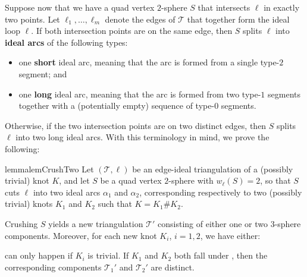 \documentclass[a4paper,UKenglish,cleveref, autoref, thm-restate]{lipics-v2021}
\newcommand{\tri}{\mathcal{T}}
\begin{document}
Suppose now that we have a quad vertex $2$-sphere $S$ that intersects $\ell$ in exactly two points.
Let $\ell_1, \ldots, \ell_m$ denote the edges of $\tri$ that together form the ideal loop $\ell$.
If both intersection points are on the same edge, then $S$ splits $\ell$ into \textbf{ideal arcs} of the following types:
\begin{itemize}
\item
one \textbf{short} ideal arc, meaning that the arc is formed from a single type-$2$ segment; and
\item
one \textbf{long} ideal arc, meaning that the arc is formed from two type-$1$ segments together with a (potentially empty) sequence of type-$0$ segments.
\end{itemize}
Otherwise, if the two intersection points are on two distinct edges, then $S$ splits $\ell$ into two long ideal arcs.
With this terminology in mind, we prove the following:

\begin{restatable}{lemma}{lemCrushTwo}\label{lem:crushW=2}
Let $(\tri,\ell)$ be an edge-ideal triangulation of a (possibly trivial) knot $K$, and let $S$ be a quad vertex $2$-sphere with $w_\ell(S)=2$,
so that $S$ cuts $\ell$ into two ideal arcs $\alpha_1$ and $\alpha_2$, corresponding respectively to two (possibly trivial) knots $K_1$ and $K_2$ such that $K = K_1 \# K_2$.

Crushing $S$ yields a new triangulation $\tri'$ consisting of either one or two $3$-sphere components.
Moreover, for each new knot $K_i$, $i=1,2$, we have either:
 can only happen if $K_i$ is trivial.
If $K_1$ and $K_2$ both fall under , then the corresponding components $\tri_1'$ and $\tri_2'$ are distinct.
\end{restatable}
\end{document}
